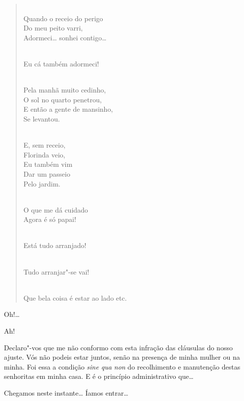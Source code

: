 \begin{linenumbers}
\begin{verse}
\\
Quando o receio do perigo\\
Do meu peito varri,\\
Adormeci\ldots{} sonhei contigo\ldots{}

\\
Eu cá também adormeci!

\\
Pela manhã muito cedinho,\\
O sol no quarto penetrou,\\
E então a gente de mansinho,\\
Se levantou.

\\
E, sem receio,\\
Florinda veio,\\
Eu também vim\\
Dar um passeio\\
Pelo jardim.

\\
O que me dá cuidado\\  
Agora é só papai!

\\
Está tudo arranjado!

\\
Tudo arranjar"-se vai!

\\
Que bela coisa é estar ao lado etc.
\end{verse}





 Oh!\ldots{}

  Ah!

 Declaro"-vos que me não conformo com esta infração das cláusulas do
nosso ajuste. Vós não podeis estar juntos, senão na presença de minha mulher ou
na minha. Foi essa a condição \textit{sine qua non} do recolhimento e manutenção
destas senhoritas em minha casa. E é o princípio administrativo que\ldots{}

  Chegamos neste instante\ldots{} Íamos entrar\ldots{}


\end{linenumbers}
